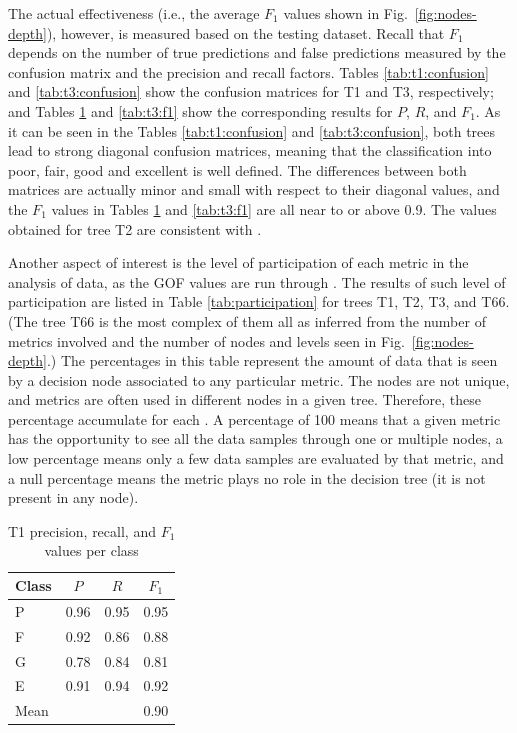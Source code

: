 The actual effectiveness (i.e., the average $F_1$ values shown in Fig.~\ref{fig:nodes-depth}), however, is measured based on the testing dataset. Recall that $F_1$ depends on the number of true predictions and false predictions measured by the confusion matrix and the precision and recall factors. Tables \ref{tab:t1:confusion} and \ref{tab:t3:confusion} show the confusion matrices for T1 and T3, respectively; and Tables \ref{tab:t1:f1} and \ref{tab:t3:f1} show the corresponding results for $P$, $R$, and $F_1$. As it can be seen in the Tables \ref{tab:t1:confusion} and \ref{tab:t3:confusion}, both trees lead to strong diagonal confusion matrices, meaning that the classification into poor, fair, good and excellent is well defined. The differences between both matrices are actually minor and small with respect to their diagonal values, and the $F_1$ values in Tables \ref{tab:t1:f1} and \ref{tab:t3:f1} are all near to or above 0.9. The values obtained for tree T2 are consistent with .

Another aspect of interest is the level of participation of each metric in the analysis of data, as the GOF values are run through . The results of such level of participation are listed in Table \ref{tab:participation} for trees T1, T2, T3, and T66. (The tree T66 is the most complex of them all as inferred from the number of metrics involved and the number of nodes and levels seen in Fig.~\ref{fig:nodes-depth}.) The percentages in this table represent the amount of data that is seen by a decision node associated to any particular metric. The nodes are not unique, and metrics are often used in different nodes in a given tree. Therefore, these percentage accumulate for each . A percentage of 100 means that a given metric has the opportunity to see all the data samples through one or multiple nodes, a low percentage means only a few data samples are evaluated by that metric, and a null percentage means the metric plays no role in the decision tree (it is not present in any node).

\begin{table}[t]
	\centering
	\caption{T1 precision, recall, and $F_1$ values per class}
	\label{tab:t1:f1}
	\small
	\begin{tabular}{lccc}
	Class   & $P$	& $R$  	& $F_1$ \\
	\hline
	P 		& 0.96 	& 0.95 	& 0.95 	\\
	F 		& 0.92 	& 0.86 	& 0.88 	\\
	G 		& 0.78 	& 0.84 	& 0.81 	\\
	E 		& 0.91 	& 0.94 	& 0.92 	\\
	\hline
	Mean 	&		&		& 0.90	\\
	\end{tabular}
\end{table}

